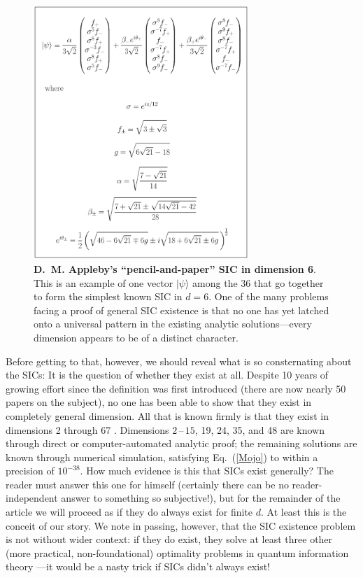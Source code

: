 \begin{figure}
\begin{center}
\includegraphics[width=3.2in]{shockvalue2.eps}
\bigskip\caption{\small {\bf D.~M. Appleby's ``pencil-and-paper'' SIC in dimension 6}. This is an example of one vector $|\psi\rangle$ among the 36 that go together to form the simplest known SIC in $d=6$.  One of the many problems facing a proof of general SIC existence is that no one has yet latched onto a universal pattern in the existing analytic solutions---every dimension appears to be of a distinct character.}
\end{center}
\end{figure}

Before getting to that, however, we should reveal what is so consternating about the SICs: It is the question of whether they exist at all.  Despite 10 years of growing effort since the definition was first introduced \cite{Zauner99,Caves99,Renes04} (there are now nearly 50 papers on the subject), no one has been able to show that they exist in completely general dimension.  All that is known firmly is that they exist in dimensions 2 through 67 \cite{Scott09}.  Dimensions $2\,$--$\,15$, 19, 24, 35, and 48 are known through direct or computer-automated analytic proof; the remaining solutions are known through numerical simulation, satisfying Eq.~(\ref{Mojo}) to within a precision of $10^{-38}$.  How much evidence is this that SICs exist generally?  The reader must answer this one for himself (certainly there can be no reader-independent answer to something so subjective!), but for the remainder of the article we will proceed as if they do always exist for finite $d$.  At least this is the conceit of our story.  We note in passing, however, that the SIC existence problem is not without wider context:  if they do exist, they solve at least three other (more practical, non-foundational) optimality problems in quantum information theory \cite{Fuchs03,Scott06,Appleby07,Wootters07}---it would be a nasty trick if SICs didn't always exist!

